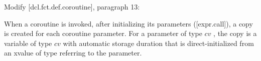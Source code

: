 Modify [dcl.fct.def.coroutine], paragraph 13:
\begin{adjustwidth}{0.5cm}{0.5cm}
When a coroutine is invoked, after initializing its parameters ([expr.call]), a copy is created for each coroutine parameter. For a parameter of type $cv$ , the copy is a variable of type $cv$  with automatic storage duration that is direct-initialized from an xvalue of type  referring to the parameter.
\end{adjustwidth}












